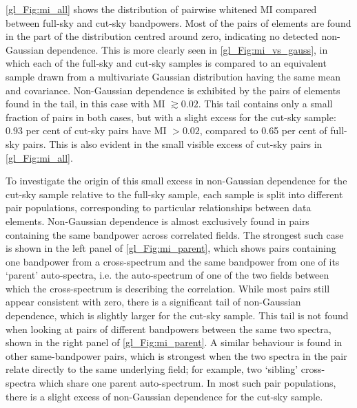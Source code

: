 \autoref{gl_Fig:mi_all} shows the distribution of pairwise whitened MI compared between full-sky and cut-sky bandpowers. Most of the pairs of elements are found in the part of the distribution centred around zero, indicating no detected non-Gaussian dependence. This is more clearly seen in \autoref{gl_Fig:mi_vs_gauss}, in which each of the full-sky and cut-sky samples is compared to an equivalent sample drawn from a multivariate Gaussian distribution having the same mean and covariance. Non-Gaussian dependence is exhibited by the pairs of elements found in the tail, in this case with MI $\gtrsim 0.02$. This tail contains only a small fraction of pairs in both cases, but with a slight excess for the cut-sky sample: 0.93 per cent of cut-sky pairs have MI $> 0.02$, compared to 0.65 per cent of full-sky pairs. This is also evident in the small visible excess of cut-sky pairs in \autoref{gl_Fig:mi_all}.

To investigate the origin of this small excess in non-Gaussian dependence for the cut-sky sample relative to the full-sky sample, each sample is split into different pair populations, corresponding to particular relationships between data elements.
Non-Gaussian dependence is almost exclusively found in pairs containing the same bandpower across correlated fields.
The strongest such case is shown in the left panel of \autoref{gl_Fig:mi_parent}, which shows pairs containing one bandpower from a cross-spectrum and the same bandpower from one of its `parent' auto-spectra, i.e. the auto-spectrum of one of the two fields between which the cross-spectrum is describing the correlation. While most pairs still appear consistent with zero, there is a significant tail of non-Gaussian dependence, which is slightly larger for the cut-sky sample. This tail is not found when looking at pairs of different bandpowers between the same two spectra, shown in the right panel of \autoref{gl_Fig:mi_parent}.
A similar behaviour is found in other same-bandpower pairs, which is strongest when the two spectra in the pair relate directly to the same underlying field; for example, two `sibling' cross-spectra which share one parent auto-spectrum. In most such pair populations, there is a slight excess of non-Gaussian dependence for the cut-sky sample.


